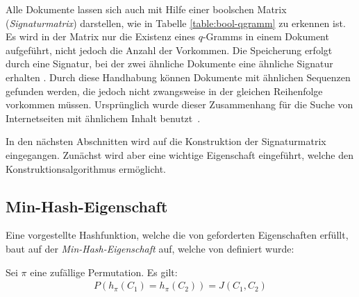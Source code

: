 Alle Dokumente lassen sich auch mit Hilfe einer boolschen Matrix (\textit{Signaturmatrix}) darstellen, wie in Tabelle \ref{table:bool-qgramm} zu erkennen ist.
Es wird in der Matrix nur die Existenz eines $q$-Gramms in einem Dokument aufgeführt, nicht jedoch die Anzahl der Vorkommen.
Die Speicherung erfolgt durch eine Signatur, bei der zwei ähnliche Dokumente eine ähnliche Signatur erhalten \citep{Leskovec2014a}. %
Durch diese Handhabung können Dokumente mit ähnlichen Sequenzen gefunden werden, die jedoch nicht zwangsweise in der gleichen Reihenfolge vorkommen müssen.
Ursprünglich wurde dieser Zusammenhang für die Suche von Internetseiten mit ähnlichem Inhalt benutzt~\cite{Slaney2008}.


In den nächsten Abschnitten wird auf die Konstruktion der Signaturmatrix eingegangen.
Zunächst wird aber eine wichtige Eigenschaft eingeführt, welche den Konstruktionsalgorithmus ermöglicht.
\subsection{Min-Hash-Eigenschaft}
\label{sec:lsh:min:eig}
Eine vorgestellte Hashfunktion, welche die von \citet{Indyk1998} geforderten Eigenschaften erfüllt, baut auf der \textit{Min-Hash-Eigenschaft} auf, welche von \citet{Leskovec2014a} definiert wurde:
\begin{theorem}
	Sei $\pi$ eine zufällige Permutation.
Es gilt:
	\begin{align*}
	P(h_\pi (C_1) = h_\pi (C_2)) = J(C_1, C_2)
	\end{align*}
\end{theorem}

